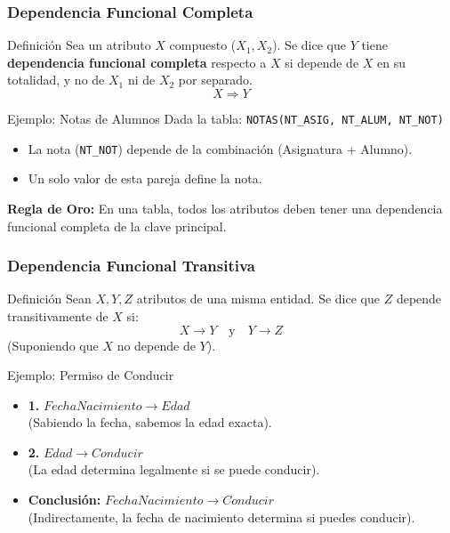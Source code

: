 \documentclass{beamer}
\begin{document}
\begin{frame}
  \frametitle{Dependencia Funcional Completa}

  \begin{block}{Definición}
    Sea un atributo $X$ compuesto ($X_1, X_2$). Se dice que $Y$ tiene \textbf{dependencia funcional completa} respecto a $X$ si depende de $X$ en su totalidad, y no de $X_1$ ni de $X_2$ por separado.
    $$ X \Rightarrow Y $$
  \end{block}

  \begin{exampleblock}{Ejemplo: Notas de Alumnos}
    Dada la tabla: \texttt{NOTAS(NT\_ASIG, NT\_ALUM, NT\_NOT)}
    \begin{itemize}
        \item La nota (\texttt{NT\_NOT}) depende de la combinación (Asignatura + Alumno).
        \item Un solo valor de esta pareja define la nota.
    \end{itemize}
  \end{exampleblock}

  \vspace{1em}
  \textbf{Regla de Oro:} En una tabla, todos los atributos deben tener una dependencia funcional completa de la clave principal.
\end{frame}

\begin{frame}
  \frametitle{Dependencia Funcional Transitiva}

  \begin{block}{Definición}
    Sean $X, Y, Z$ atributos de una misma entidad. Se dice que $Z$ depende transitivamente de $X$ si:
    $$ X \to Y \quad \text{y} \quad Y \to Z $$
    \small{(Suponiendo que $X$ no depende de $Y$).}
  \end{block}

  \begin{exampleblock}{Ejemplo: Permiso de Conducir}
    \begin{itemize}
        \item \textbf{1.} $FechaNacimiento \to Edad$ \\
        (Sabiendo la fecha, sabemos la edad exacta).
        
        \item \textbf{2.} $Edad \to Conducir$ \\
        (La edad determina legalmente si se puede conducir).
        
        \item \textbf{Conclusión:} $FechaNacimiento \to Conducir$ \\
        (Indirectamente, la fecha de nacimiento determina si puedes conducir).
    \end{itemize}
  \end{exampleblock}

\end{frame}
\end{document}
